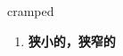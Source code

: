 
\begin{frame}
{\huge cramped}
\begin{center}
\begin{enumerate}\Large
  \item \textbf{狭小的，狭窄的}
\end{enumerate}
\end{center}
\end{frame}
